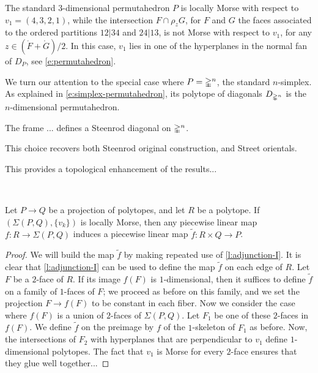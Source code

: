 \begin{example}
	The standard $3$-dimensional permutahedron $P$ is locally Morse with respect to $v_1=(4,3,2,1)$, while the intersection $F \cap \rho_z G$, for $F$ and $G$ the faces associated to the ordered partitions $12|34$ and $24|13$, is not Morse with respect to $v_1$, for any $z \in (\mathring F + \mathring G)/2$.
	In this case, $v_1$ lies in one of the hyperplanes in the normal fan of $D_P$, see \cref{e:permutahedron}.
\end{example}


We turn our attention to the special case where $P = \mathbb{\Delta}^n$, the standard $n$-simplex.
As explained in \cref{e:simplex-permutahedron}, its polytope of diagonals $D_{\mathbb{\Delta}^n}$ is the $n$-dimensional permutahedron.

\begin{lemma}
	The frame ... defines a Steenrod diagonal on $\mathbb{\Delta}^n$.
\end{lemma}

\begin{theorem}
	This choice recovers both Steenrod original construction, and Street orientals.
\end{theorem}

This provides a topological enhancement of the results...



\ \ \


\begin{theorem}
	Let $P \to Q$ be a projection of polytopes, and let $R$ be a polytope. 
	If $(\Sigma(P,Q), \{v_k\})$ is locally Morse, then any piecewise linear map $f: R \to \Sigma(P,Q)$ induces a piecewise linear map $\tilde f : R \times Q \to P$. 
\end{theorem}

\begin{proof}
	We will build the map $\tilde f$ by making repeated use of \cref{l:adjunction-I}. 
	It is clear that \cref{l:adjunction-I} can be used to define the map $\tilde f$ on each edge of $R$. 
	Let $F$ be a $2$-face of $R$. 
	If its image $f(F)$ is $1$-dimensional, then it suffices to define $\tilde f$ on a family of $1$-faces of $F$; we proceed as before on this family, and we set the projection $F \to f(F)$ to be constant in each fiber. 
	Now we consider the case where $f(F)$ is a union of $2$-faces of $\Sigma(P,Q)$. 
	Let $F_1$ be one of these $2$-faces in $f(F)$. 
	We define $\tilde f$ on the preimage by $f$ of the $1$-skeleton of $F_1$ as before. 
	Now, the intersections of $F_2$ with hyperplanes that are perpendicular to $v_1$ define $1$-dimensional polytopes. 
	The fact that $v_1$ is Morse for every $2$-face ensures that they glue well together...
\end{proof}

